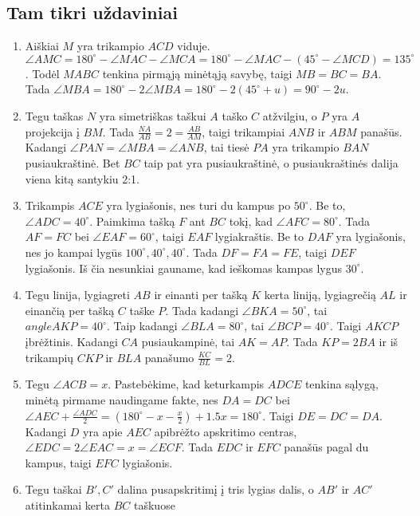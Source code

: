 \subsection*{Tam tikri uždaviniai}
\begin{enumerate}
\item
  Aiškiai $M$ yra trikampio $ACD$ viduje. $\angle AMC =
  180^\circ - \angle MAC - \angle MCA = 180^\circ - \angle
  MAC - (45^\circ - \angle MCD) = 135^\circ$. Todėl $MABC$
  tenkina pirmąją minėtąją savybę, taigi $MB = BC = BA$.
  Tada $\angle MBA = 180^\circ - 2\angle MBA = 180^\circ -
  2(45^\circ + u) = 90^\circ - 2u$. 
\item
  Tegu taškas $N$ yra simetriškas taškui $A$ taško $C$
  atžvilgiu, o $P$ yra $A$ projekcija į $BM$. Tada
  $\frac{NA}{AB} = 2 = \frac{AB}{AM}$, taigi trikampiai
  $ANB$ ir $ABM$ panašūs. Kadangi $\angle PAN = \angle MBA
  = \angle ANB$, tai tiesė $PA$ yra trikampio $BAN$
  pusiaukraštinė.  Bet $BC$ taip pat yra pusiaukraštinė, o
  pusiaukraštinės dalija viena kitą santykiu 2:1. 
\item
  Trikampis $ACE$ yra lygiašonis, nes turi du kampus po
  $50^\circ$. Be to, $\angle ADC = 40^\circ$. Paimkima
  tašką $F$ ant $BC$ tokį, kad $\angle AFC = 80^\circ$.
  Tada $AF = FC$ bei $\angle EAF = 60^\circ$, taigi $EAF$
  lygiakraštis. Be to $DAF$ yra lygiašonis, nes jo kampai
  lygūs $100^\circ, 40^\circ, 40^\circ$. Tada $DF = FA =
  FE$, taigi $DEF$ lygiašonis. Iš čia nesunkiai gauname,
  kad ieškomas kampas lygus $30^\circ$.   
\item
  Tegu linija, lygiagreti $AB$ ir einanti per tašką $K$
  kerta liniją, lygiagrečią $AL$ ir einančią per tašką $C$
  taške $P$. Tada kadangi $\angle BKA = 50^\circ$, tai
  $angle AKP = 40^\circ$. Taip kadangi $\angle BLA =
  80^\circ$, tai $\angle BCP = 40^\circ$. Taigi $AKCP$
  įbrėžtinis. Kadangi $CA$ pusiaukampinė, tai $AK = AP$.
  Tada $KP = 2BA$ ir iš trikampių $CKP$ ir $BLA$ panašumo
  $\frac{KC}{BL} = 2$.  
\item
  Tegu $\angle ACB = x$. Pastebėkime, kad keturkampis
  $ADCE$ tenkina sąlygą, minėtą pirmame naudingame fakte,
  nes $DA = DC$ bei $\angle AEC + \frac{\angle ADC}{2} =
  (180^\circ - x - \frac{x}{2}) + 1.5x = 180^\circ$. Taigi
  $DE = DC = DA$. Kadangi $D$ yra apie $AEC$ apibrėžto
  apskritimo centras, $\angle EDC = 2\angle EAC = x =
  \angle ECF$. Tada $EDC$ ir $EFC$ panašūs pagal du kampus,
  taigi $EFC$ lygiašonis.
\item
  Tegu taškai $B',C'$ dalina pusapskritimį į tris lygias
  dalis, o $AB'$ ir $AC'$ atitinkamai kerta $BC$ taškuose

\end{enumerate}
